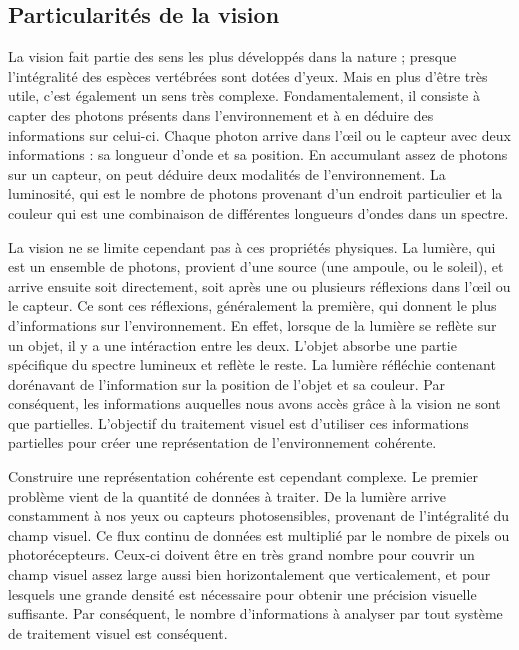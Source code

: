 \subsection{Particularités de la vision}\label{sec:sota:vision}

	La vision fait partie des sens les plus développés dans la nature ; presque l'intégralité des espèces vertébrées sont dotées d'yeux. Mais en plus d'être très utile, c'est également un sens très complexe. Fondamentalement, il consiste à capter des photons présents dans l'environnement et à en déduire des informations sur celui-ci. Chaque photon arrive dans l'œil ou le capteur avec deux informations : sa longueur d'onde et sa position. En accumulant assez de photons sur un capteur, on peut déduire deux modalités de l'environnement. La luminosité, qui est le nombre de photons provenant d'un endroit particulier et la couleur qui est une combinaison de différentes longueurs d'ondes dans un spectre.

	La vision ne se limite cependant pas à ces propriétés physiques. La lumière, qui est un ensemble de photons, provient d'une source (une ampoule, ou le soleil), et arrive ensuite soit directement, soit après une ou plusieurs réflexions dans l'œil ou le capteur. Ce sont ces réflexions, généralement la première, qui donnent le plus d'informations sur l'environnement. En effet, lorsque de la lumière se reflète sur un objet, il y a une intéraction entre les deux. L'objet absorbe une partie spécifique du spectre lumineux et reflète le reste. La lumière réfléchie contenant dorénavant de l'information sur la position de l'objet et sa couleur. Par conséquent, les informations auquelles nous avons accès grâce à la vision ne sont que partielles. L'objectif du traitement visuel est d'utiliser ces informations partielles pour créer une représentation de l'environnement cohérente.

	Construire une représentation cohérente est cependant complexe. Le premier problème vient de la quantité de données à traiter. De la lumière arrive constamment à nos yeux ou capteurs photosensibles, provenant de l'intégralité du champ visuel. Ce flux continu de données est multiplié par le nombre de pixels ou photorécepteurs. Ceux-ci doivent être en très grand nombre pour couvrir un champ visuel assez large aussi bien horizontalement que verticalement, et pour lesquels une grande densité est nécessaire pour obtenir une précision visuelle suffisante. Par conséquent, le nombre d'informations à analyser par tout système de traitement visuel est conséquent.


